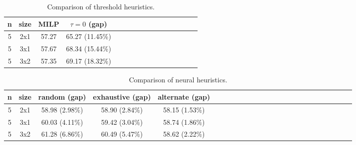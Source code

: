 

\begin{knitrout}
\color{fgcolor}\begin{table}

\caption{\label{tab:unnamed-chunk-2}Comparison of threshold heuristics.}
\centering
\begin{tabular}[t]{cc|c|ccc|c|ccc|c|ccc|c|c}
\toprule
n & size & MILP & $\tau = 0$  (gap)\\
\midrule
5 & 2x1 & 57.27 & 65.27 (11.45\%)\\
5 & 3x1 & 57.67 & 68.34 (15.44\%)\\
5 & 3x2 & 57.35 & 69.17 (18.32\%)\\
\bottomrule
\end{tabular}
\end{table}

\begin{table}

\caption{\label{tab:unnamed-chunk-2}Comparison of neural heuristics.}
\centering
\begin{tabular}[t]{cc|c|c|ccc|c|c|ccc|c|c|ccc|c|c|ccc|c|c|c}
\toprule
n & size & random (gap) & exhaustive (gap) & alternate (gap)\\
\midrule
5 & 2x1 & 58.98 (2.98\%) & 58.90 (2.84\%) & 58.15 (1.53\%)\\
5 & 3x1 & 60.03 (4.11\%) & 59.42 (3.04\%) & 58.74 (1.86\%)\\
5 & 3x2 & 61.28 (6.86\%) & 60.49 (5.47\%) & 58.62 (2.22\%)\\
\bottomrule
\end{tabular}
\end{table}

\end{knitrout}
